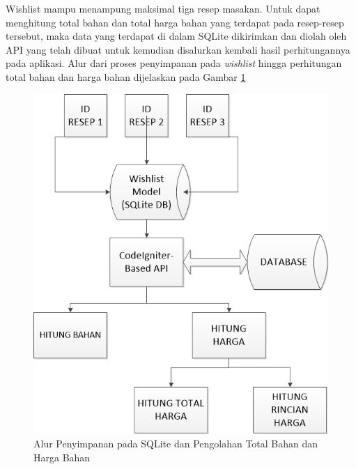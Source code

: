 		Wishlist mampu menampung maksimal tiga resep masakan. Untuk dapat menghitung total bahan dan total harga bahan yang terdapat pada resep-resep tersebut, maka data yang terdapat di dalam SQLite dikirimkan dan diolah oleh API yang telah dibuat untuk kemudian disalurkan kembali hasil perhitungannya pada aplikasi. Alur dari proses penyimpanan pada \textit{wishlist} hingga perhitungan total bahan dan harga bahan dijelaskan pada Gambar \ref{fitur-lain}
		\begin{figure}[H]
			\centering
			\includegraphics[width=1\textwidth]{gambar/new/fitur_lain}
			\caption{Alur Penyimpanan pada SQLite dan Pengolahan Total Bahan dan Harga Bahan}
			\label{fitur-lain}
		\end{figure}

